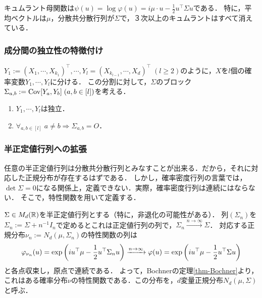 \documentclass[uplatex,dvipdfmx]{jsreport}
\begin{document}
\begin{corollary}
    キュムラント母関数は$\psi(u)=\log\varphi(u)=i\mu\cdot u-\frac{1}{2}u^\top\Sigma u$である．
    特に，平均ベクトルは$\mu$，分散共分散行列が$\Sigma$で，３次以上のキュムラントはすべて消えている．
\end{corollary}

\subsubsection{成分間の独立性の特徴付け}

\begin{proposition}[多次元正規確率変数の成分間の独立性]
    $Y_1:=(X_1,\cdots,X_{k_1})^\top,\cdots,Y_l=(X_{k_{l-1}},\cdots,X_d)^\top\;(l\ge 2)$のように，$X$を$l$個の確率変数$Y_1,\cdots,Y_l$に分ける．
    この分割に対して，$\Sigma$のブロック$\Sigma_{a,b}:=\mathrm{Cov}[Y_a,Y_b]\;(a,b\in[l])$を考える．
    \begin{enumerate}
        \item $Y_1,\cdots,Y_l$は独立．
        \item $\forall_{a,b\in[l]}\;a\ne b\Rightarrow\Sigma_{a,b}=O$．
    \end{enumerate}
\end{proposition}

\subsubsection{半正定値行列への拡張}

\begin{tcolorbox}[colframe=ForestGreen, colback=ForestGreen!10!white,breakable,colbacktitle=ForestGreen!40!white,coltitle=black,fonttitle=\bfseries\sffamily,
title=]
    任意の半正定値行列は分散共分散行列とみなすことが出来る．だから，それに対応した正規分布が存在するはずである．
    しかし，確率密度行列の言葉では，$\det\Sigma=0$になる関係上，定義できない．実際，確率密度行列は連続にはならない．
    そこで，特性関数を用いて定義する．
\end{tcolorbox}

\begin{definition}
    $\Sigma\in M_d(\mathbb{R})$を半正定値行列とする（特に，非退化の可能性がある）．
    列$(\Sigma_n)$を$\Sigma_n:=\Sigma+n^{-1}I_n$で定めるとこれは正定値行列の列で，$\Sigma_n\xrightarrow{n\to\infty}\Sigma$．
    対応する正規分布$\nu_n:=N_d(\mu,\Sigma_n)$の特性関数の列は
    \[\varphi_{\nu_n}(u)=\exp\left(iu^\top\mu-\frac{1}{2}u^\top\Sigma_nu\right)\xrightarrow{n\to\infty}\varphi(u)=\exp\left(iu^\top\mu-\frac{1}{2}u^\top\Sigma u\right)\]
    と各点収束し，原点で連続である．
    よって，Bochnerの定理\ref{thm-Bochner}より，これはある確率分布$\nu$の特性関数である．この分布を，$d$変量正規分布$N_d(\mu,\Sigma)$と呼ぶ．
\end{definition}
\end{document}
